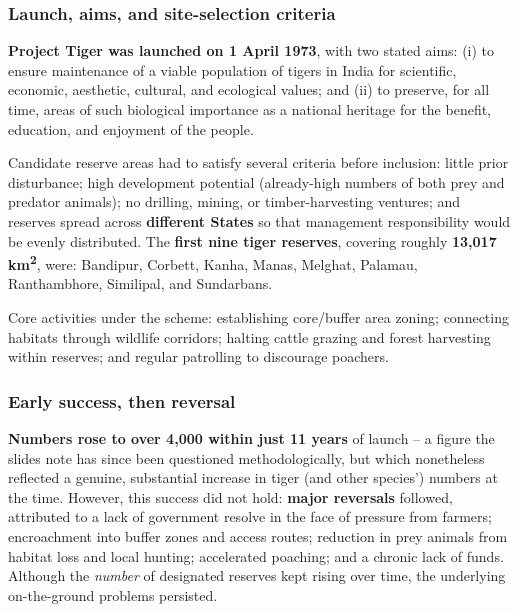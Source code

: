 \documentclass[11pt,a4paper]{article}
\begin{document}
\subsubsection{Launch, aims, and site-selection criteria}
\textbf{Project Tiger was launched on 1 April 1973}, with two stated aims: (i) to ensure maintenance of a viable population of tigers in India for scientific, economic, aesthetic, cultural, and ecological values; and (ii) to preserve, for all time, areas of such biological importance as a national heritage for the benefit, education, and enjoyment of the people.

Candidate reserve areas had to satisfy several criteria before inclusion: little prior disturbance; high development potential (already-high numbers of both prey and predator animals); no drilling, mining, or timber-harvesting ventures; and reserves spread across \textbf{different States} so that management responsibility would be evenly distributed. The \textbf{first nine tiger reserves}, covering roughly \textbf{13{,}017 km\textsuperscript{2}}, were: Bandipur, Corbett, Kanha, Manas, Melghat, Palamau, Ranthambhore, Similipal, and Sundarbans.

Core activities under the scheme: establishing core/buffer area zoning; connecting habitats through wildlife corridors; halting cattle grazing and forest harvesting within reserves; and regular patrolling to discourage poachers.

\subsubsection{Early success, then reversal}
\textbf{Numbers rose to over 4{,}000 within just 11 years} of launch -- a figure the slides note has since been questioned methodologically, but which nonetheless reflected a genuine, substantial increase in tiger (and other species') numbers at the time. However, this success did not hold: \textbf{major reversals} followed, attributed to a lack of government resolve in the face of pressure from farmers; encroachment into buffer zones and access routes; reduction in prey animals from habitat loss and local hunting; accelerated poaching; and a chronic lack of funds. Although the \emph{number} of designated reserves kept rising over time, the underlying on-the-ground problems persisted.
\end{document}
